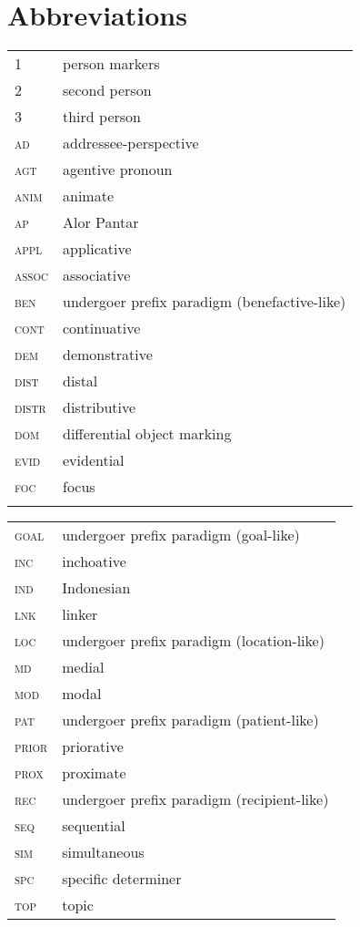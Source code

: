 \documentclass[output=paper]{LSP/langsci}
\begin{document}
\section*{Abbreviations}
\begin{tabularx}{.45\textwidth}{lQ}
1 & person markers\\
2 & second person\\
3 & third person\\
\textsc{ad} & addressee-perspective\\
\textsc{agt} & agentive pronoun\\
\textsc{anim} & animate\\
\textsc{ap} & Alor Pantar\\
\textsc{appl} & applicative\\
\textsc{assoc} & associative\\
\textsc{ben} & undergoer prefix paradigm (benefactive-like)\\
\textsc{cont} & continuative\\
\textsc{dem} & demonstrative\\
\textsc{dist} & distal\\
\textsc{distr} & distributive\\
\textsc{dom}& differential object marking\\
\textsc{evid} & evidential\\
\textsc{foc} & focus\\
\\
\end{tabularx}
\begin{tabularx}{.45\textwidth}{lQ}
\textsc{goal} & undergoer prefix paradigm (goal-like)\\
\textsc{inc} & inchoative\\
\textsc{ind} & Indonesian\\
\textsc{lnk} & linker\\
\textsc{loc} & undergoer prefix paradigm (location-like)\\
\textsc{md} & medial\\
\textsc{mod} & modal\\
\textsc{pat} & undergoer prefix paradigm (patient-like)\\
\textsc{prior} & priorative\\
\textsc{prox} & proximate\\
\textsc{rec} & undergoer prefix paradigm (recipient-like)\\
\textsc{seq} & sequential\\
\textsc{sim} & simultaneous\\
\textsc{spc} & specific determiner\\
\textsc{top} & topic\\
\end{tabularx}


{\sloppy
\printbibliography[heading=subbibliography,notkeyword=this] }
\end{document}
